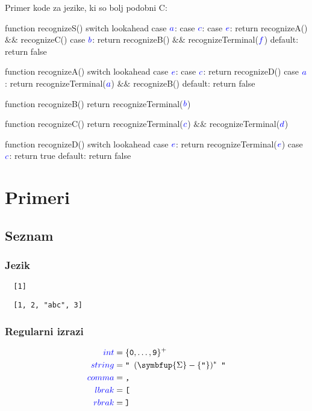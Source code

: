 \documentclass{article}
\newcommand{\Symbol}[1]{\textcolor{blue}{#1}}
\newcommand{\Alphabet}{\symbfup{\Sigma}}
\newcommand{\Char}[1]{\texttt{#1}}
\newcommand{\Seq}{{\ \,}}
\newcommand{\Kleene}[1]{#1^\ast}
\newcommand{\KleenePlus}[1]{#1^+}
\begin{document}
\newpage
Primer kode za jezike, ki so bolj podobni C:
\begin{algorithm}
  function recognizeS()
    switch lookahead
      case $\Symbol{a}$:
      case $\Symbol{c}$:
      case $\Symbol{e}$:
        return recognizeA() $\&\&$ recognizeC()
      case $\Symbol{b}$:
        return recognizeB() $\&\&$ recognizeTerminal($\Symbol{f}$)
      default:
        return false

  function recognizeA()
     switch lookahead
      case $\Symbol{e}$:
      case $\Symbol{c}$:
        return recognizeD()
      case $\Symbol{a}$:
        return recognizeTerminal($\Symbol{a}$) $\&\&$ recognizeB()
      default:
        return false

  function recognizeB()
    return recognizeTerminal($\Symbol{b}$)

  function recognizeC()
    return recognizeTerminal($\Symbol{c}$) $\&\&$ recognizeTerminal($\Symbol{d}$)

  function recognizeD()
    switch lookahead
      case $\Symbol{e}$:
        return recognizeTerminal($\Symbol{e}$)
      case $\Symbol{c}$:
        return true
      default:
        return false
\end{algorithm}

\section{Primeri}


\subsection{Seznam}

\subsubsection*{Jezik}
\begin{verbatim}
  [1]
\end{verbatim}
\begin{verbatim}
  [1, 2, "abc", 3]
\end{verbatim}

\subsubsection*{Regularni izrazi}
\begin{equation*}
  \begin{aligned}
    \Symbol{int} &= \KleenePlus{\{\Char{0}, \dots, \Char{9}\}}\\
    \Symbol{string} &= \Char{"} \Seq \Kleene{(\Alphabet - \{\Char{"}\})} \Seq \Char{"}\\
    \Symbol{comma} &= \Char{,}\\
    \Symbol{lbrak} &= \Char{[}\\
    \Symbol{rbrak} &= \Char{]}\\
  \end{aligned}
\end{equation*}
\end{document}
